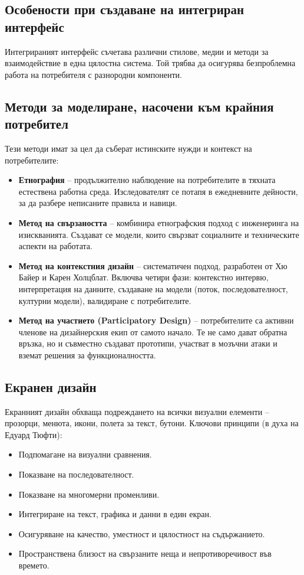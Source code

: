 \documentclass{scrartcl}
\begin{document}
\begin{FlushLeft}
\section{Особености при създаване на интегриран интерфейс}

Интегрираният интерфейс съчетава различни стилове, медии и методи за взаимодействие в една цялостна система. Той трябва да осигурява безпроблемна работа на потребителя с разнородни компоненти.

\subsection{Методи за моделиране, насочени към крайния потребител}

Тези методи имат за цел да съберат истинските нужди и контекст на потребителите:
\begin{itemize}
    \item \textbf{Етнография} – продължително наблюдение на потребителите в тяхната естествена работна среда. Изследователят се потапя в ежедневните дейности, за да разбере неписаните правила и навици.
    \item \textbf{Метод на свързаността} – комбинира етнографския подход с инженеринга на изискванията. Създават се модели, които свързват социалните и техническите аспекти на работата.
    \item \textbf{Метод на контекстния дизайн} – систематичен подход, разработен от Хю Байер и Карен Холцблат. Включва четири фази: контекстно интервю, интерпретация на данните, създаване на модели (поток, последователност, културни модели), валидиране с потребителите.
    \item \textbf{Метод на участието (Participatory Design)} – потребителите са активни членове на дизайнерския екип от самото начало. Те не само дават обратна връзка, но и съвместно създават прототипи, участват в мозъчни атаки и вземат решения за функционалността.
\end{itemize}

\subsection{Екранен дизайн}

Екранният дизайн обхваща подреждането на всички визуални елементи – прозорци, менюта, икони, полета за текст, бутони. Ключови принципи (в духа на Едуард Тюфти):
\begin{itemize}
    \item Подпомагане на визуални сравнения.
    \item Показване на последователност.
    \item Показване на многомерни променливи.
    \item Интегриране на текст, графика и данни в един екран.
    \item Осигуряване на качество, уместност и цялостност на съдържанието.
    \item Пространствена близост на свързаните неща и непротиворечивост във времето.
\end{itemize}


\end{FlushLeft}
\end{document}
